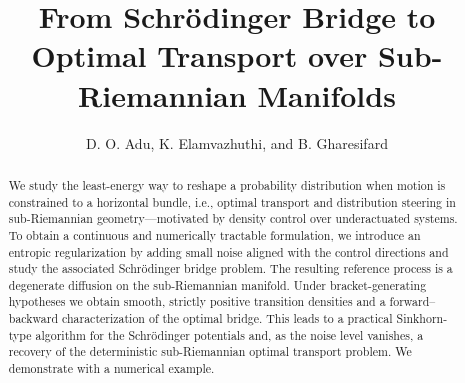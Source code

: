 \documentclass{amsart}
\numberwithin{equation}{section}
\begin{document}
\begin{abstract}
We study the least-energy way to reshape a probability distribution when motion is constrained to a horizontal bundle, i.e., optimal transport and distribution steering in sub-Riemannian geometry—motivated by density control over underactuated systems. To obtain a continuous and numerically tractable formulation, we introduce an entropic regularization by adding small noise aligned with the control directions and study the associated Schr\"odinger bridge problem. The resulting reference process is a degenerate diffusion on the sub-Riemannian manifold. Under bracket-generating hypotheses we obtain smooth, strictly positive transition densities and a forward--backward characterization of the optimal bridge. This leads to a practical Sinkhorn-type algorithm for the Schr\"odinger potentials and, as the noise level vanishes, a recovery of the deterministic sub-Riemannian optimal transport problem. We demonstrate with a numerical example.
\end{abstract}

\title[From Schr\"odinger Bridge to Optimal Transport over Sub-Riemannian Manifolds]{From Schr\"odinger Bridge to Optimal Transport over Sub-Riemannian Manifolds}



\author[D. O. Adu, K. Elamvazhuthi, and B. Gharesifard ]{D. O. Adu, K. Elamvazhuthi, and B. Gharesifard}

\maketitle
\end{document}
